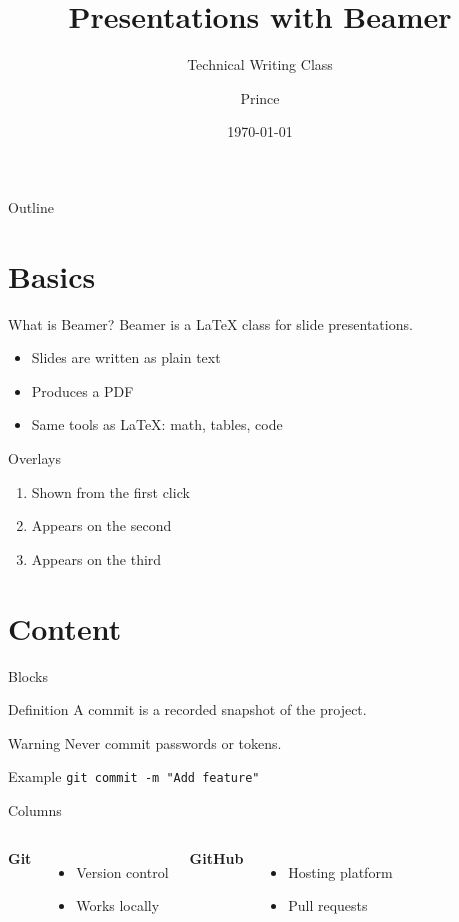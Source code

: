 \documentclass[aspectratio=169]{beamer}
\title[Beamer Demo]{Presentations with Beamer}
\subtitle{Technical Writing Class}
\author{Prince}
\institute[MNIT]{MNIT Jaipur}
\date{\today}
\begin{document}
\begin{frame}
  \titlepage
\end{frame}

\begin{frame}{Outline}
  \tableofcontents
\end{frame}

\section{Basics}
\begin{frame}{What is Beamer?}
  Beamer is a \LaTeX{} class for slide presentations.
  \begin{itemize}
    \item Slides are written as plain text
    \item Produces a PDF
    \item Same tools as \LaTeX{}: math, tables, code
  \end{itemize}
\end{frame}

\begin{frame}{Overlays}
  \begin{enumerate}
    \item<1-> Shown from the first click
    \item<2-> Appears on the second
    \item<3-> Appears on the third
  \end{enumerate}
\end{frame}

\section{Content}
\begin{frame}{Blocks}
  \begin{block}{Definition}
    A commit is a recorded snapshot of the project.
  \end{block}
  \begin{alertblock}{Warning}
    Never commit passwords or tokens.
  \end{alertblock}
  \begin{exampleblock}{Example}
    \texttt{git commit -m "Add feature"}
  \end{exampleblock}
\end{frame}

\begin{frame}{Columns}
  \begin{columns}
    \textbf{Git}
    \begin{itemize}
      \item Version control
      \item Works locally
    \end{itemize}
    \textbf{GitHub}
    \begin{itemize}
      \item Hosting platform
      \item Pull requests
    \end{itemize}
  \end{columns}
\end{frame}
\end{document}
